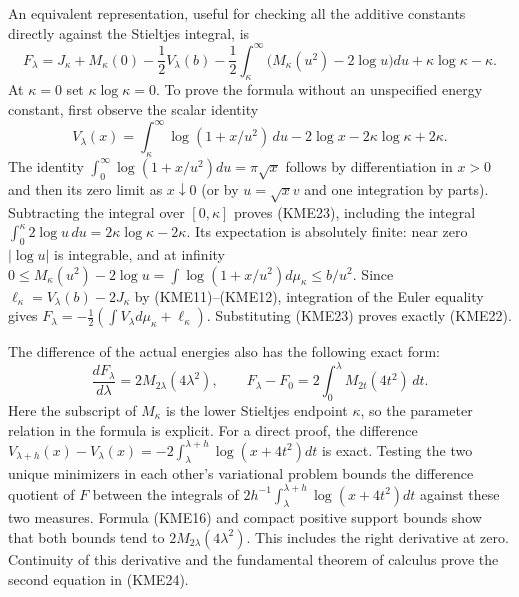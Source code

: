 An equivalent representation, useful for checking all the additive
constants directly against the Stieltjes integral, is
\begin{equation}\tag{KME22}
 \boxed{F_\lambda=J_\kappa+M_\kappa(0)-\frac12V_\lambda(b)
      -\frac12\int_\kappa^\infty\bigl(M_\kappa(u^2)-2\log u\bigr)du
                          +\kappa\log \kappa-\kappa.}
\end{equation}
At $\kappa=0$ set $\kappa\log \kappa=0$.
To prove the formula without an unspecified energy constant, first
observe the scalar identity
\begin{equation}\tag{KME23}
 V_\lambda(x)=\int_\kappa^\infty\log(1+x/u^2)\,du
                           -2\log x-2\kappa\log \kappa+2\kappa.
\end{equation}
The identity $\int_0^\infty\log(1+x/u^2)du=\pi\sqrt x$
follows by differentiation in $x>0$ and then its zero limit as
$x\downarrow0$ (or by $u=\sqrt x v$ and one integration by parts).
Subtracting the integral over $[0,\kappa]$ proves (KME23), including the
integral $\int_0^\kappa2\log u\,du=2\kappa\log \kappa-2\kappa$.
Its expectation is absolutely finite: near zero $|\log u|$ is
integrable, and at infinity
$0\leq M_\kappa(u^2)-2\log u
=\int\log(1+x/u^2)d\mu_\kappa\leq b/u^2$.
Since $\ell_\kappa=V_\lambda(b)-2J_\kappa$ by (KME11)--(KME12), integration
of the Euler equality gives
$F_\lambda=-\tfrac12(\int V_\lambda d\mu_\kappa+\ell_\kappa)$.
Substituting (KME23) proves exactly (KME22).

The difference of the actual energies also has the following exact form:
\begin{equation}\tag{KME24}
 \boxed{\frac{dF_\lambda}{d\lambda}=2M_{2\lambda}(4\lambda^2),
 \qquad F_\lambda-F_0=2\int_0^\lambda M_{2t}(4t^2)\,dt.}
\end{equation}
Here the subscript of $M_\kappa$ is the lower Stieltjes endpoint $\kappa$, so
the parameter relation in the formula is explicit.
For a direct proof, the difference
$V_{\lambda+h}(x)-V_\lambda(x)
=-2\int_\lambda^{\lambda+h}\log(x+4t^2)dt$
is exact. Testing the two unique minimizers in each other's variational
problem bounds the difference quotient of $F$ between the integrals
of $2h^{-1}\int_\lambda^{\lambda+h}\log(x+4t^2)dt$ against these
two measures. Formula (KME16) and compact positive support bounds show
that both bounds tend to $2M_{2\lambda}(4\lambda^2)$.
This includes the right derivative at zero. Continuity of this
derivative and the fundamental theorem of calculus prove the second
equation in (KME24).

